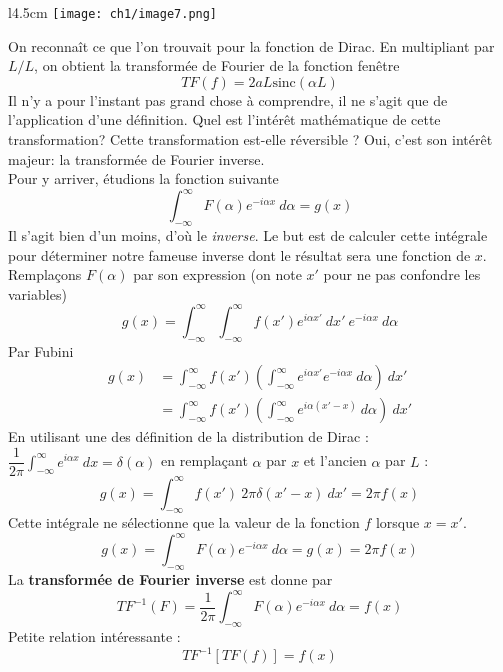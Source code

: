 \begin{wrapfigure}[8]{l}{4.5cm}
\vspace{-25mm}
\texttt{[image: ch1/image7.png]}
\end{wrapfigure}
On reconnaît ce que l'on trouvait pour la fonction de Dirac. En multipliant par $L/L$, on obtient 
la transformée de Fourier de la fonction fenêtre
\begin{equation}
TF(f) = 2aL\text{sinc}(\alpha L)
\end{equation}
Il n'y a pour l'instant pas grand chose à comprendre, il ne s'agit que de l'application d'une 
définition. Quel est l'intérêt mathématique de cette transformation? Cette transformation est-elle
réversible ? Oui, c'est son intérêt majeur: la transformée de Fourier inverse.\\
Pour y arriver, étudions la fonction suivante
\begin{equation}
\int_{-\infty}^\infty F(\alpha)e^{-i\alpha x}\ d\alpha  = g(x)
\end{equation}
\danger Il s'agit bien d'un moins, d'où le \textit{inverse}. Le but est de calculer cette intégrale 
pour déterminer notre fameuse inverse dont le résultat sera une fonction de $x$. Remplaçons $F(\alpha)$ 
par son expression (on note $x'$ pour ne pas confondre les variables)
\begin{equation}
g(x)= \int_{-\infty}^\infty \int_{-\infty}^\infty  f(x')e^{i\alpha x'}\ dx'\ e^{-i\alpha x}\ d\alpha
\end{equation}
Par Fubini
\begin{equation}
\begin{array}{ll}
g(x) &= \int_{-\infty}^\infty  f(x') \left(\int_{-\infty}^\infty  e^{i\alpha x'}e^{-i\alpha x}\ d\alpha\right)\ dx'\\
&= \int_{-\infty}^\infty  f(x') \left(\int_{-\infty}^\infty  e^{i\alpha (x'-x)}\ d\alpha\right)\ dx'
\end{array}
\end{equation}
En utilisant une des définition de la distribution de Dirac : $\dfrac{1}{2\pi}\int_{-\infty}^\infty 
e^{i\alpha x}\ dx  = \delta(\alpha)$ en remplaçant $\alpha$ par $x$ et l'ancien $\alpha$ par $L$ :
\begin{equation}
g(x) = \int_{-\infty}^\infty  f(x')\ 2\pi\delta(x'-x)\ dx' = 2\pi f(x)
\end{equation}
Cette intégrale ne sélectionne que la valeur de la fonction $f$ lorsque $x=x'$. 
\begin{equation}
g(x) = \int_{-\infty}^\infty F(\alpha)e^{-i\alpha x}\ d\alpha  = g(x) = 2\pi f(x)
\end{equation}
La \textbf{transformée de Fourier inverse} est donne par
\begin{equation}
TF^{-1}(F) = \frac{1}{2\pi}\int_{-\infty}^\infty F(\alpha)e^{-i\alpha x}\ d\alpha = f(x)
\end{equation}
Petite relation intéressante :
\begin{equation}
TF^{-1}[TF(f)] = f(x)
\end{equation}

